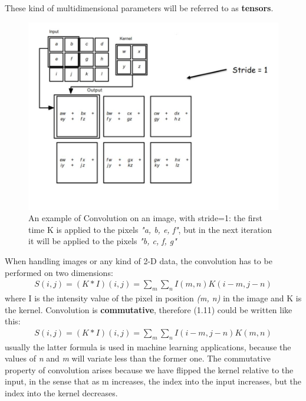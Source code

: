 \documentclass[11pt,a4paper,titlepage]{book}
\begin{document}
These kind of multidimensional parameters will be referred to as \textbf{tensors}.
\begin{figure}[ht]
    \includegraphics[scale=0.5]{imgs/ch_1/convolution.jpg}
    \centering
    \caption{An example of Convolution on an image, with stride=1: the first time K is applied to the pixels \textit{"a, b, e, f"}, but in the next iteration it will be applied to the pixels \textit{"b, c, f, g"}}
    \label{convolution_example}
\end{figure}
\newline
\newline
When handling images or any kind of 2-D data, the convolution has to be performed on two dimensions:
\begin{align}
    S(i, j) = (K * I)(i, j) = \sum_{m}\sum_{n}I(m,n)K(i - m, j - n)
\end{align}
where I is the intensity value of the pixel in position \textit{(m, n)} in the image and K is the kernel. 
\newline
\newline
Convolution is \textbf{commutative}, therefore (1.11) could be written like this:
\begin{align}
    S(i, j) = (K * I)(i, j) = \sum_{m}\sum_{n}I(i - m, j - n)K(m, n)
\end{align}
usually the latter formula is used in machine learning applications, because the values of \textit{n} and \textit{m} will variate less than the former one.
\newline
\newline
The commutative property of convolution arises because we have flipped the kernel relative to the input, in the sense that as m increases, the index into the input increases, but the index into the kernel decreases.
\end{document}
